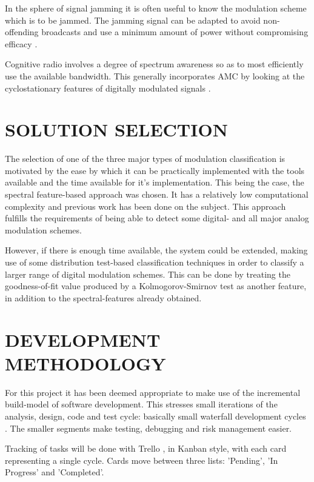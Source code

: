 \documentclass[10pt,twocolumn]{witseiepaper}
\begin{document}
In the sphere of signal jamming it is often useful to know the modulation scheme which is to be jammed. The jamming signal can be adapted to avoid non-offending broadcasts and use a minimum amount of power without compromising efficacy \cite{azzouz2013automatic}.

Cognitive radio involves a degree of spectrum awareness so as to most efficiently use the available bandwidth\cite{kim2007cyclostationary}. This generally incorporates AMC by looking at the cyclostationary features of digitally modulated signals \cite{kim2007cyclostationary}.

\section{SOLUTION SELECTION}
	The selection of one of the three major types of modulation classification is motivated by the ease by which it can be practically implemented with the tools available and the time available for it's implementation. 
	This being the case, the spectral feature-based approach was chosen. It has a relatively low computational complexity and previous work has been done on the subject. This approach fulfills the requirements of being able to detect some digital- and all major analog modulation schemes.

	However, if there is enough time available, the system could be extended, making use of some distribution test-based classification techniques in order to classify a larger range of digital modulation schemes. This can be done by treating the goodness-of-fit value produced by a Kolmogorov-Smirnov test as another feature, in addition to the spectral-features already obtained.

\section{DEVELOPMENT METHODOLOGY} 
	For this project it has been deemed appropriate to make use of the incremental build-model of software development. This stresses small iterations of the analysis, design, code and test cycle: basically small waterfall development cycles \cite{incremental_model, waterfall_model}. The smaller segments make testing, debugging and risk management easier.

	Tracking of tasks will be done with Trello \cite{trello}, in Kanban style, with each card representing a single cycle\cite{kanban_model}. Cards move between three lists: 'Pending', 'In Progress' and 'Completed'.
\end{document}
